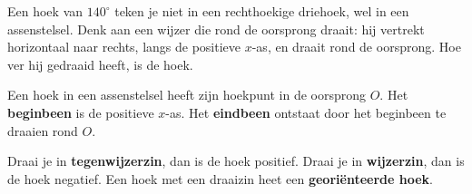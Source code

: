 Een hoek van $140^\circ$ teken je niet in een rechthoekige driehoek, wel in een assenstelsel. Denk aan een wijzer die rond de oorsprong draait: hij vertrekt horizontaal naar rechts, langs de positieve $x$-as, en draait rond de oorsprong. Hoe ver hij gedraaid heeft, is de hoek.

\begin{theorie}
\begin{minipage}[t]{.6\linewidth}
\vspace{0pt}
Een hoek in een assenstelsel heeft zijn hoekpunt in de oorsprong $O$. Het \textbf{\textcolor{accent}{beginbeen}} is de positieve $x$-as. Het \textbf{\textcolor{accent}{eindbeen}} ontstaat door het beginbeen te draaien rond $O$.

\vspace{1mm}
Draai je in \textbf{\textcolor{accent}{tegenwijzerzin}}, dan is de hoek positief. Draai je in \textbf{\textcolor{accent}{wijzerzin}}, dan is de hoek negatief. Een hoek met een draaizin heet een \textbf{\textcolor{accent}{georiënteerde hoek}}.
\end{minipage}\hfill
\begin{minipage}[t]{.36\linewidth}
\vspace{0pt}
\centering
{}
\end{minipage}
\end{theorie}

